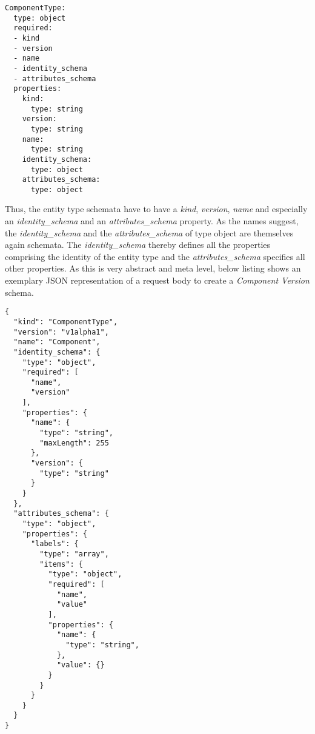 \begin{lstlisting}[basicstyle=\tiny, caption=Entity Type Schema Schema, captionpos=b, label=lst:EntityTypeSchemaSchema]
ComponentType:
  type: object
  required:
  - kind
  - version
  - name
  - identity_schema
  - attributes_schema
  properties:
    kind: 
      type: string
    version:
      type: string
    name:
      type: string
    identity_schema:
      type: object
    attributes_schema:
      type: object
\end{lstlisting}

Thus, the entity type schemata have to have a \emph{kind}, \emph{version}, \emph{name} and especially an \emph{identity\_schema} and an \emph{attributes\_schema} property. As the names suggest, the \emph{identity\_schema} and the \emph{attributes\_schema} of type object are themselves again schemata. The \emph{identity\_schema} thereby defines all the properties comprising the identity of the entity type and the \emph{attributes\_schema} specifies all other properties. As this is very abstract and meta level, below listing shows an exemplary JSON representation of a request body to create a \emph{Component Version} schema. 

\begin{lstlisting}[basicstyle=\tiny, caption=Request Body for Component Version Schema Creation, captionpos=b, label=lst:ComponentVersionSchemaCreation]
{
  "kind": "ComponentType",
  "version": "v1alpha1",
  "name": "Component",
  "identity_schema": {
    "type": "object",
    "required": [
      "name",
      "version"
    ],
    "properties": {
      "name": {
        "type": "string",
        "maxLength": 255
      },
      "version": {
        "type": "string"
      }
    }
  },
  "attributes_schema": {
    "type": "object",
    "properties": {
      "labels": {
        "type": "array",
        "items": {
          "type": "object",
          "required": [
            "name",
            "value"
          ],
          "properties": {
            "name": {
              "type": "string",
            },
            "value": {}
          }
        }  
      }
    }
  }
}
\end{lstlisting}

